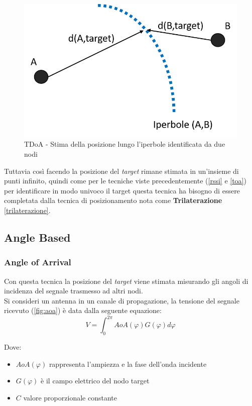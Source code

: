 \begin{figure}[H]  
	\centering 
	\includegraphics[scale=0.4]{ContestoApplicativo/tdoa1.png}
	\caption{TDoA - Stima della posizione lungo l'iperbole identificata da due nodi}
	\label{fig:tdoa1}
\end{figure}

	Tuttavia così facendo la posizione del \textit{target} rimane stimata in un'insieme di punti infinito, quindi come per le tecniche viste precedentemente (\ref{rssi} e \ref{toa}) per identificare in modo univoco il target questa tecnica ha bisogno di essere completata dalla tecnica di posizionamento nota come \textbf{Trilaterazione} \ref{trilaterazione}.

\subsection{Angle Based}
\label{angle}
\subsubsection{Angle of Arrival}
\label{aoa}
Con questa tecnica la posizione del \textit{target} viene stimata misurando gli angoli di incidenza del segnale trasmesso ad altri nodi.\\
Si consideri \cite{aoa} un antenna in un canale di propagazione, la tensione del segnale ricevuto (\ref{fig:aoa}) è data dalla seguente equazione:\\
\begin{equation}
 V = \int_{0}^{2\pi} AoA(\varphi) G(\varphi)d\varphi 
\end{equation}

Dove:
\begin{itemize}
	\item $AoA(\varphi)$ rappresenta l'ampiezza e la fase dell'onda incidente
	\item $G(\varphi)$ è il campo elettrico del nodo target 
	\item $C$ valore proporzionale constante
\end{itemize}

